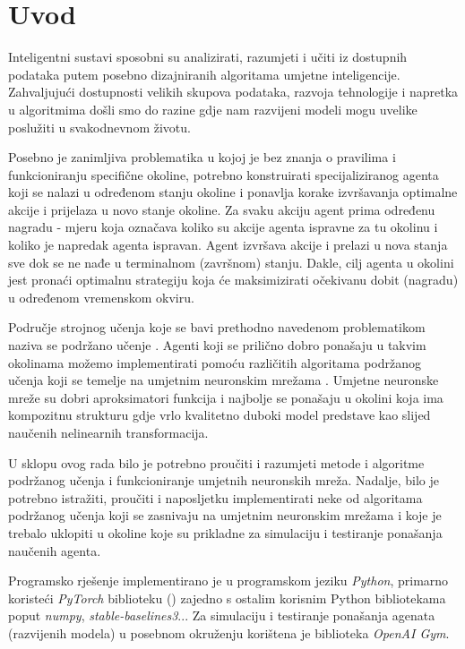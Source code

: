 \chapter{Uvod}
Inteligentni sustavi sposobni su analizirati, razumjeti i učiti iz dostupnih podataka putem posebno dizajniranih algoritama umjetne inteligencije. Zahvaljujući dostupnosti velikih skupova podataka, razvoja tehnologije i napretka u algoritmima došli smo do razine gdje nam razvijeni modeli mogu uvelike poslužiti u svakodnevnom životu.

Posebno je zanimljiva problematika u kojoj je bez znanja o pravilima i funkcioniranju specifične okoline, potrebno konstruirati specijaliziranog agenta koji se nalazi u određenom stanju okoline i ponavlja korake izvršavanja optimalne akcije i prijelaza u novo stanje okoline. Za svaku akciju agent prima određenu nagradu - mjeru koja označava koliko su akcije agenta ispravne za tu okolinu i koliko je napredak agenta ispravan. Agent izvršava akcije i prelazi u nova stanja sve dok se ne nađe u terminalnom (završnom) stanju. Dakle, cilj agenta u okolini jest pronaći optimalnu strategiju koja će maksimizirati očekivanu dobit (nagradu) u određenom vremenskom okviru.

Područje strojnog učenja koje se bavi prethodno navedenom problematikom naziva se podržano učenje . Agenti koji se prilično dobro ponašaju u takvim okolinama možemo implementirati pomoću različitih algoritama podržanog učenja koji se temelje na umjetnim neuronskim mrežama . Umjetne neuronske mreže su dobri aproksimatori funkcija i najbolje se ponašaju u okolini koja ima kompozitnu strukturu gdje vrlo kvalitetno duboki model predstave kao slijed naučenih nelinearnih transformacija.

U sklopu ovog rada bilo je potrebno proučiti i razumjeti metode i algoritme podržanog učenja i funkcioniranje umjetnih neuronskih mreža. Nadalje, bilo je potrebno istražiti, proučiti i naposljetku implementirati neke od algoritama podržanog učenja koji se zasnivaju na umjetnim neuronskim mrežama i koje je trebalo uklopiti u okoline koje su prikladne za simulaciju i testiranje ponašanja naučenih agenta.

Programsko rješenje implementirano je u programskom jeziku \textit{Python}, primarno koristeći \textit{PyTorch} biblioteku () zajedno s ostalim korisnim Python bibliotekama poput \textit{numpy}, \textit{stable-baselines3}... Za simulaciju i testiranje ponašanja agenata (razvijenih modela) u posebnom okruženju korištena je biblioteka \textit{OpenAI Gym}. 
